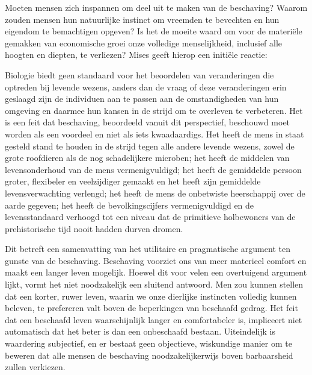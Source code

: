 Moeten mensen zich inspannen om deel uit te maken van de beschaving? Waarom zouden mensen hun natuurlijke instinct om vreemden te bevechten en hun eigendom te bemachtigen opgeven? Is het de moeite waard om voor de materiële gemakken van economische groei onze volledige menselijkheid, inclusief alle hoogten en diepten, te verliezen? Mises geeft hierop een initiële reactie:

\begin{blockquotebox}
Biologie biedt geen standaard voor het beoordelen van veranderingen die optreden bij levende wezens, anders dan de vraag of deze veranderingen erin geslaagd zijn de individuen aan te passen aan de omstandigheden van hun omgeving en daarmee hun kansen in de strijd om te overleven te verbeteren. Het is een feit dat beschaving, beoordeeld vanuit dit perspectief, beschouwd moet worden als een voordeel en niet als iets kwaadaardigs. Het heeft de mens in staat gesteld stand te houden in de strijd tegen alle andere levende wezens, zowel de grote roofdieren als de nog schadelijkere microben; het heeft de middelen van levensonderhoud van de mens vermenigvuldigd; het heeft de gemiddelde persoon groter, flexibeler en veelzijdiger gemaakt en het heeft zijn gemiddelde levensverwachting verlengd; het heeft de mens de onbetwiste heerschappij over de aarde gegeven; het heeft de bevolkingscijfers vermenigvuldigd en de levensstandaard verhoogd tot een niveau dat de primitieve holbewoners van de prehistorische tijd nooit hadden durven dromen.\footnotemark
\end{blockquotebox}
\autocite{217}

Dit betreft een samenvatting van het utilitaire en pragmatische argument ten gunste van de beschaving. Beschaving voorziet ons van meer materieel comfort en maakt een langer leven mogelijk. Hoewel dit voor velen een overtuigend argument lijkt, vormt het niet noodzakelijk een sluitend antwoord. Men zou kunnen stellen dat een korter, ruwer leven, waarin we onze dierlijke instincten volledig kunnen beleven, te prefereren valt boven de beperkingen van beschaafd gedrag. Het feit dat een beschaafd leven waarschijnlijk langer en comfortabeler is, impliceert niet automatisch dat het beter is dan een onbeschaafd bestaan. Uiteindelijk is waardering subjectief, en er bestaat geen objectieve, wiskundige manier om te beweren dat alle mensen de beschaving noodzakelijkerwijs boven barbaarsheid zullen verkiezen.

